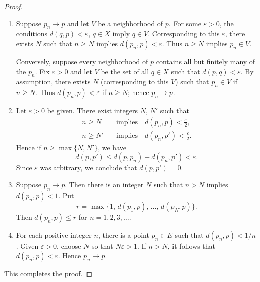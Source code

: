 \begin{proof}
\begin{enumerate}[label=(\alph*), leftmargin=2.2em, itemsep=4pt, topsep=3pt]
  \item Suppose $p_n \to p$ and let $V$ be a neighborhood of $p$. For some
        $\varepsilon > 0$, the conditions $d(q,p) < \varepsilon$, $q \in X$
        imply $q \in V$. Corresponding to this $\varepsilon$, there exists $N$
        such that $n \ge N$ implies $d(p_n,p) < \varepsilon$. Thus $n \ge N$
        implies $p_n \in V$.

        Conversely, suppose every neighborhood of $p$ contains all but
        finitely many of the $p_n$. Fix $\varepsilon > 0$ and let $V$ be the
        set of all $q \in X$ such that $d(p,q) < \varepsilon$. By assumption,
        there exists $N$ (corresponding to this $V$) such that $p_n \in V$ if
        $n \ge N$. Thus $d(p_n,p) < \varepsilon$ if $n \ge N$; hence
        $p_n \to p$.
  \item Let $\varepsilon > 0$ be given. There exist integers $N$, $N'$ such
        that
        \begin{align*}
          n \ge N &\quad\text{implies}\quad d(p_n,p) < \frac{\varepsilon}{2},\\
          n \ge N' &\quad\text{implies}\quad d(p_n,p') < \frac{\varepsilon}{2}.
        \end{align*}
        Hence if $n \ge \max\{N,N'\}$, we have
        \[ d(p,p') \le d(p,p_n) + d(p_n,p') < \varepsilon. \]
        Since $\varepsilon$ was arbitrary, we conclude that
        $d(p,p') = 0$.
  \item Suppose $p_n \to p$. Then there is an integer $N$ such that $n > N$
        implies $d(p_n,p) < 1$. Put
        \[ r = \max\{1,\, d(p_1,p),\, \dots,\, d(p_N,p)\}. \]
        Then $d(p_n,p) \le r$ for $n = 1,2,3,\dots$.
  \item For each positive integer $n$, there is a point $p_n \in E$ such that
        $d(p_n,p) < 1/n$. Given $\varepsilon > 0$, choose $N$ so that
        $N\varepsilon > 1$. If $n > N$, it follows that
        $d(p_n,p) < \varepsilon$. Hence $p_n \to p$.
\end{enumerate}
This completes the proof.
\end{proof}

